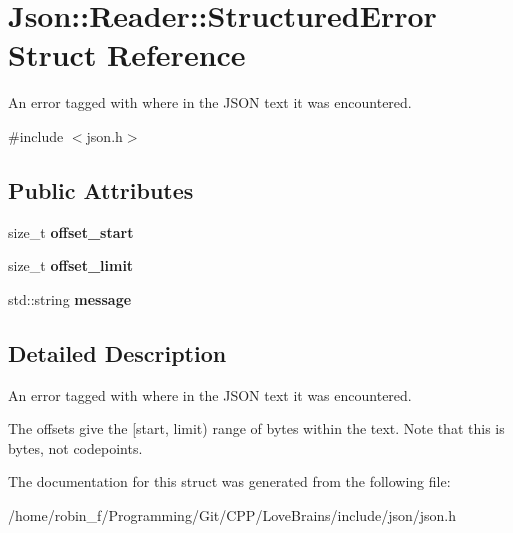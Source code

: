 \section{Json\+:\+:Reader\+:\+:Structured\+Error Struct Reference}
\label{struct_json_1_1_reader_1_1_structured_error}


An error tagged with where in the J\+S\+O\+N text it was encountered.  




{\ttfamily \#include $<$json.\+h$>$}

\subsection*{Public Attributes}
\begin{DoxyCompactItemize}
\item 
size\+\_\+t {\bfseries offset\+\_\+start}\label{struct_json_1_1_reader_1_1_structured_error_a160dae4eb3464a2209b743c755baf65f}

\item 
size\+\_\+t {\bfseries offset\+\_\+limit}\label{struct_json_1_1_reader_1_1_structured_error_a80747dae744bcc80a9bc81c94fd42e13}

\item 
std\+::string {\bfseries message}\label{struct_json_1_1_reader_1_1_structured_error_ab8755e5201b78c6ae077338f8819e6e6}

\end{DoxyCompactItemize}


\subsection{Detailed Description}
An error tagged with where in the J\+S\+O\+N text it was encountered. 

The offsets give the [start, limit) range of bytes within the text. Note that this is bytes, not codepoints. 

The documentation for this struct was generated from the following file\+:\begin{DoxyCompactItemize}
\item 
/home/robin\+\_\+f/\+Programming/\+Git/\+C\+P\+P/\+Love\+Brains/include/json/json.\+h\end{DoxyCompactItemize}
